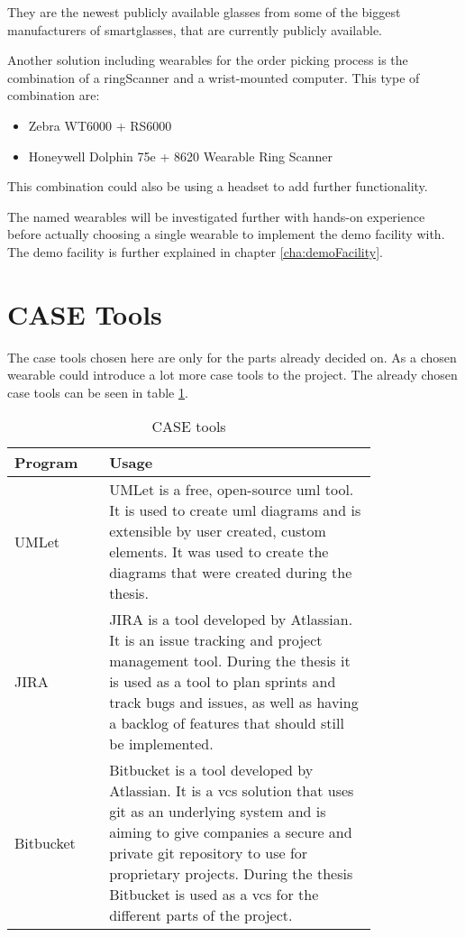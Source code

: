 They are the newest publicly available glasses from some of the biggest manufacturers of \gls{smartglasses}, that are currently publicly available.

Another solution including wearables for the order picking process is the combination of a \gls{ringScanner} and a wrist-mounted computer. This type of combination are:

\begin{itemize}
	\item Zebra WT6000 + RS6000
	\item Honeywell Dolphin 75e + 8620 Wearable Ring Scanner
\end{itemize}

This combination could also be using a headset to add further functionality.

The named wearables will be investigated further with hands-on experience before actually choosing a single wearable to implement the demo facility with. The demo facility is further explained in chapter \ref{cha:demoFacility}.

\cleardoublepage

\section{CASE Tools}\label{sec:caseTools}
The \gls{case} tools chosen here are only for the parts already decided on. As a chosen wearable could introduce a lot more \gls{case} tools to the project. The already chosen \gls{case} tools can be seen in table \ref{tab:case}.

\begin{table}[htbp]
	\begin{center}
	\begin{tabular}{|p{0.2\linewidth}|p{0.6\linewidth}|} \hline
	\textbf{Program} & \textbf{Usage} \\ \hline
	UMLet & UMLet is a free, open-source \gls{uml} tool. It is used to create \gls{uml} diagrams and is extensible by user created, custom elements. \cite{website:umlet} It was used to create the diagrams that were created during the thesis.  \\ \hline
	JIRA & JIRA is a tool developed by Atlassian. It is an issue tracking and project management tool. During the thesis it is used as a tool to plan sprints and track bugs and issues, as well as having a backlog of features that should still be implemented. \\ \hline
	Bitbucket & Bitbucket is a tool developed by Atlassian. It is a \gls{vcs} solution that uses git as an underlying system and is aiming to give companies a secure and private git repository to use for proprietary projects. During the thesis Bitbucket is used as a \gls{vcs} for the different parts of the project. \\ \hline
	\end{tabular}
	\end{center}
	\caption{CASE tools}\label{tab:case}
\end{table}